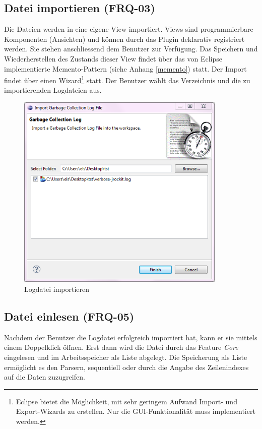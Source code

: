 \subsection{Datei importieren (FRQ-03)}
Die Dateien werden in eine eigene View importiert. Views sind programmierbare Komponenten (Ansichten) und können durch das Plugin deklarativ registriert werden. Sie stehen anschliessend dem Benutzer zur Verfügung. Das Speichern und Wiederherstellen des Zustands dieser View findet über das von Eclipse implementierte Memento-Pattern (siehe Anhang \ref{memento}) statt. Der Import findet über einen Wizard\footnote{Eclipse bietet die Möglichkeit, mit sehr geringem Aufwand Import- und Export-Wizards zu erstellen. Nur die GUI-Funktionalität muss implementiert werden.} statt. Der Benutzer wählt das Verzeichnis und die zu importierenden Logdateien aus. \begin{figure}[H]
  	\centering
    	\includegraphics[width=10cm]{images/tutorial_importlog}
        	\caption{Logdatei importieren}
\end{figure}

\subsection{Datei einlesen (FRQ-05)}
Nachdem der Benutzer die Logdatei erfolgreich importiert hat, kann er sie mittels einem Doppelklick öffnen. Erst dann wird die Datei durch das Feature \textit{Core} eingelesen und im Arbeitsspeicher als Liste abgelegt. Die Speicherung als Liste ermöglicht es den Parsern, sequentiell oder durch die Angabe des Zeilenindexes auf die Daten zuzugreifen.

